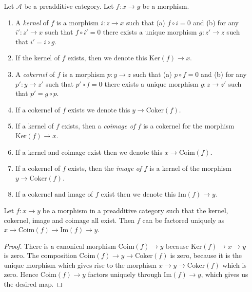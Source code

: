 \begin{definition}
\label{definition-kernel}
Let $\mathcal{A}$ be a preadditive category.
Let $f : x \to y$ be a morphism.
\begin{enumerate}
\item A {\it kernel} of $f$ is a morphism
$i : z \to x$ such that (a) $f \circ i = 0$ and (b)
for any $i' : z' \to x$ such that $f \circ i' = 0$ there
exists a unique morphism $g : z' \to z$ such that
$i' = i \circ g$.
\item If the kernel of $f$ exists, then we denote
this $\text{Ker}(f) \to x$.
\item A {\it cokernel} of $f$ is a morphism
$p : y \to z$ such that (a) $p \circ f = 0$ and (b)
for any $p' : y \to z'$ such that $p' \circ f = 0$ there
exists a unique morphism $g : z \to z'$ such that
$p' = g \circ p$.
\item If a cokernel of $f$ exists we denote this
$y \to \text{Coker}(f)$.
\item If a kernel of $f$ exists, then a {\it coimage
of $f$} is a cokernel for the morphism $\text{Ker}(f) \to x$.
\item If a kernel and coimage exist then we denote this
$x \to \text{Coim}(f)$.
\item If a cokernel of $f$ exists, then the {\it image of
$f$} is a kernel of the morphism $y \to \text{Coker}(f)$.
\item If a cokernel and image of $f$ exist then we denote
this $\text{Im}(f) \to y$.
\end{enumerate}
\end{definition}

\begin{lemma}
\label{lemma-coim-im-map}
Let $f : x \to y$ be a morphism in a preadditive category
such that the kernel, cokernel, image and coimage all exist.
Then $f$ can be factored uniquely as
$x \to \text{Coim}(f) \to \text{Im}(f) \to y$.
\end{lemma}

\begin{proof}
There is a canonical morphism $\text{Coim}(f) \to y$
because $\text{Ker}(f) \to x \to y$ is zero.
The composition $\text{Coim}(f) \to y \to \text{Coker}(f)$
is zero, because it is the unique morphism which gives
rise to the morphism $x \to y \to \text{Coker}(f)$ which
is zero. Hence $\text{Coim}(f) \to y$ factors uniquely through
$\text{Im}(f) \to y$, which gives us the desired map.
\end{proof}

